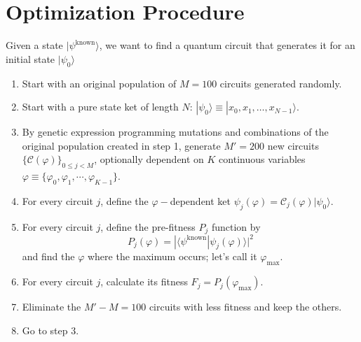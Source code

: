 \documentclass{article}
\begin{document}
\section{Optimization Procedure}
Given a state $|\psi^{\textrm{known}}\rangle$, we want to find a quantum
circuit that generates it for an initial state $|\psi_0\rangle$
\begin{enumerate}
	\item Start with an original population of $M=100$ circuits generated randomly.
	\item Start with a pure state ket of length $N$: $|\psi_0\rangle\equiv|x_0, x_1, \ldots, x_{N-1}\rangle$.
	\item By genetic expression programming mutations and combinations of the original 
	population created in step 1, generate $M'=200$ new circuits
	$\{\mathcal{C}(\varphi)\}_{0\le j<M}$, optionally dependent on $K$ continuous variables
	$\varphi\equiv\{\varphi_0, \varphi_1, \cdots, \varphi_{K-1}\}$.
	\item For every circuit $j$, define the $\varphi-$dependent ket $\psi_j(\varphi)=\mathcal{C}_j(\varphi)|\psi_0\rangle$.
	\item For every circuit $j$, define the pre-fitness $P_j$ function by
	\begin{equation}
		P_j(\varphi) = |\langle \psi^{\textrm{known}} | \psi_j(\varphi)\rangle|^2
	\end{equation}
	and find the $\varphi$ where the maximum occurs; let's call it $\varphi_{\textrm{max}}$.
	\item For every circuit $j$, calculate its fitness $F_j = P_j(\varphi_{\textrm{max}})$.
	\item Eliminate the $M'-M=100$ circuits with less fitness and keep the others.
	\item Go to step 3. 
\end{enumerate}
\end{document}
